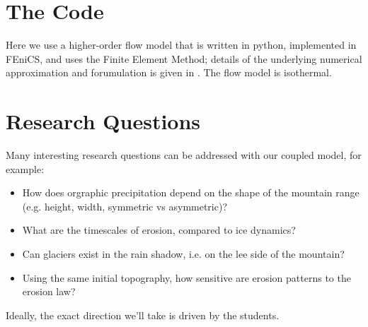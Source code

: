 \documentclass[11pt]{article}
\begin{document}
\section{The Code}

Here we use a higher-order flow model that is written in python, implemented in FEniCS, and uses the Finite Element Method; details of the underlying numerical approximation and forumulation is given in  \cite{Brinkerhoff2015a}. The flow model is isothermal.

\section{Research Questions}

Many interesting research questions can be addressed with our coupled model, for example:
\begin{itemize}
\item How does orgraphic precipitation depend on the shape of the mountain range (e.g. height, width, symmetric vs asymmetric)?
\item What are the timescales of erosion, compared to ice dynamics?
\item Can glaciers exist in the rain shadow, i.e. on the lee side of the mountain?
\item Using the same initial topography, how sensitive are erosion patterns to the erosion law?
\end{itemize}
Ideally, the exact direction we'll take is driven by the students.
\end{document}

